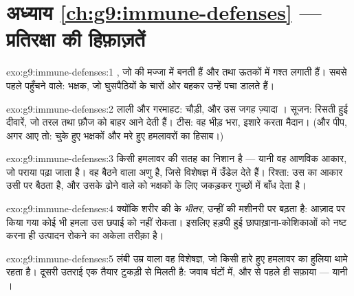 \section*{अध्याय \ref{ch:g9:immune-defenses} --- प्रतिरक्षा की हिफ़ाज़तें}

\begin{solution}{exo:g9:immune-defenses:1}
, जो  की मज्जा में बनती हैं और  तथा ऊतकों में
गश्त लगाती हैं। सबसे पहले पहुँचने वाले: भक्षक, जो घुसपैठियों के चारों ओर
बहकर उन्हें पचा डालते हैं।
\end{solution}

\begin{solution}{exo:g9:immune-defenses:2}
लाली और गरमाहट:  चौड़ी, और उस जगह ज़्यादा । सूजन: रिसती हुई
दीवारें, जो तरल तथा फ़ौज को बाहर आने देती हैं। टीस: वह भीड़ भरा,
इशारे करता मैदान। (और पीप, अगर आए तो: चुके हुए भक्षकों और मरे हुए
हमलावरों का हिसाब।)
\end{solution}

\begin{solution}{exo:g9:immune-defenses:3}
 किसी हमलावर की सतह का निशान है --- यानी वह आणविक आकार, जो पराया
पढ़ा जाता है।  वह बैठने वाला अणु है, जिसे विशेषज्ञ  में
उँडेल देते हैं। रिश्ता: उस  का आकार उसी  पर बैठता है, और
उसके ढोने वाले को भक्षकों के लिए जकड़कर गुच्छों में बाँध देता है।
\end{solution}

\begin{solution}{exo:g9:immune-defenses:4}
क्योंकि  शरीर की  के \emph{भीतर}, उन्हीं की मशीनरी पर बढ़ता
है: आज़ाद  पर किया गया कोई भी हमला उस छपाई को नहीं रोकता। इसलिए
हड़पी हुई छापाख़ाना-कोशिकाओं को नष्ट करना ही उत्पादन रोकने का अकेला
तरीक़ा है।
\end{solution}

\begin{solution}{exo:g9:immune-defenses:5}
लंबी उम्र वाला वह विशेषज्ञ, जो किसी हारे हुए हमलावर का हुलिया थामे रहता
है। दूसरी उतराई एक तैयार टुकड़ी से मिलती है: जवाब घंटों में, और 
से पहले ही सफ़ाया --- यानी ।
\end{solution}

